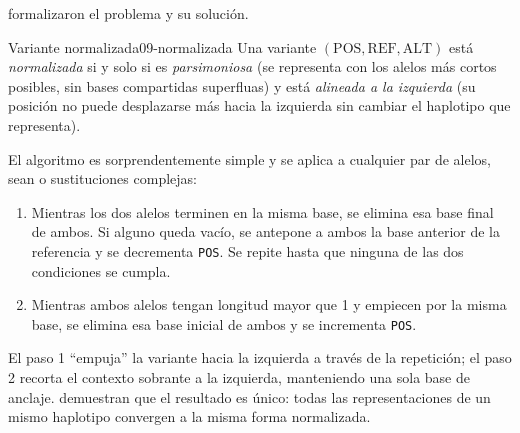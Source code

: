 \textcite{c09-tan2015} formalizaron el problema y su solución.

\begin{definicion}{Variante normalizada}{09-normalizada}
Una variante $(\mathrm{POS},\mathrm{REF},\mathrm{ALT})$ está \emph{normalizada} si y solo si es \emph{parsimoniosa} (se representa con los alelos más cortos posibles, sin bases compartidas superfluas) y está \emph{alineada a la izquierda} (su posición no puede desplazarse más hacia la izquierda sin cambiar el haplotipo que representa).
\end{definicion}

El algoritmo es sorprendentemente simple y se aplica a cualquier par de alelos, sean  o sustituciones complejas:

\begin{enumerate}
  \item Mientras los dos alelos terminen en la misma base, se elimina esa base final de ambos. Si alguno queda vacío, se antepone a ambos la base anterior de la referencia y se decrementa \texttt{POS}. Se repite hasta que ninguna de las dos condiciones se cumpla.
  \item Mientras ambos alelos tengan longitud mayor que 1 y empiecen por la misma base, se elimina esa base inicial de ambos y se incrementa \texttt{POS}.
\end{enumerate}

El paso 1 ``empuja'' la variante hacia la izquierda a través de la repetición; el paso 2 recorta el contexto sobrante a la izquierda, manteniendo una sola base de anclaje. \textcite{c09-tan2015} demuestran que el resultado es único: todas las representaciones de un mismo haplotipo convergen a la misma forma normalizada.

